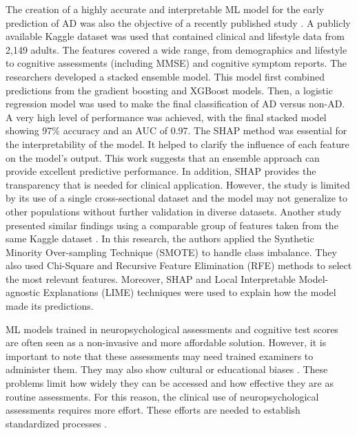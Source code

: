 The creation of a highly accurate and interpretable ML model for the early prediction of AD was also the objective of a recently published study \cite{Hossain2025Optimizing}. A publicly available Kaggle dataset was used that contained clinical and lifestyle data from 2,149 adults. The features covered a wide range, from demographics and lifestyle to cognitive assessments (including MMSE) and cognitive symptom reports. The researchers developed a stacked ensemble model. This model first combined predictions from the gradient boosting and XGBoost models. Then, a logistic regression model was used to make the final classification of AD versus non-AD. A very high level of performance was achieved, with the final stacked model showing 97\% accuracy and an AUC of 0.97. The SHAP method was essential for the interpretability of the model. It helped to clarify the influence of each feature on the model's output. This work suggests that an ensemble approach can provide excellent predictive performance. In addition, SHAP provides the transparency that is needed for clinical application. However, the study is limited by its use of a single cross-sectional dataset and the model may not generalize to other populations without further validation in diverse datasets. Another study presented similar findings using a comparable group of features taken from the same Kaggle dataset \cite{Mahamud2025Enhancing}. In this research, the authors applied the Synthetic Minority Over-sampling Technique (\acrshort{SMOTE}) to handle class imbalance. They also used Chi-Square and Recursive Feature Elimination (\acrshort{RFE}) methods to select the most relevant features. Moreover, SHAP and Local Interpretable Model-agnostic Explanations (\acrshort{LIME}) techniques were used to explain how the model made its predictions.

ML models trained in neuropsychological assessments and cognitive test scores are often seen as a non-invasive and more affordable solution. However, it is important to note that these assessments may need trained examiners to administer them. They may also show cultural \cite{Puente2015Neuropsychological} or educational biases \cite{Noroozian2014Impact}. These problems limit how widely they can be accessed and how effective they are as routine assessments. For this reason, the clinical use of neuropsychological assessments requires more effort. These efforts are needed to establish standardized processes \cite{Alzola2024Neuropsychological}.


